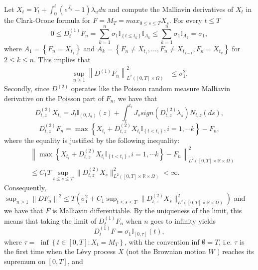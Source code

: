 \documentclass[11pt]{article}
\numberwithin{equation}{section}
\begin{document}
Let $X_t=Y_t+\int_0^t (e^{J_u}-1) \lambda_u du$ and compute the Malliavin derivatives of $X_t$ in the Clark-Ocone formula for $F= M_T= max_{0 \leq s \leq T}X_s$. For every $t\leq T$
$$
0 \leq D_{t}^{(1)} F_{n}=\sum_{k=1}^{n} \sigma_1 \mathbb{I}_{\left\{t \leq t_{k}\right\}} \mathbb{I}_{A_{k}} \leq \sum_{k=1}^{n} \sigma_1 \mathbb{I}_{A_{k}}=\sigma_1,
$$
where $A_{1}=\left\{F_{n}=X_{t_{1}}\right\}$ and $A_{k}=\left\{F_{n} \neq X_{t_{1}}, \ldots, F_{n} \neq X_{t_{k-1}}, F_{n}=X_{t_{k}}\right\}$ for $2 \leq k \leq n$. This implies that 
\begin{align*}
\sup _{n \geq 1}\left\|D^{(1)} F_{n}\right\|_{L^{2}([0, T] \times \Omega)}^{2} & \leq \sigma_1^{2}.
\end{align*} 
Secondly, since $D^{(2)}$ operates like the Poisson random measure Malliavin derivative on the Poisson part of $F_{n}$, we have that
$$D_{t, z}^{(2)} X_{t_i}=J_{t}\mathbb{I}_{(0,\lambda_t)}(z)+\int_t^{t_i} J_s sign{(D_{t,z}^{(2)}\lambda_s)}N_{t,z}(ds), $$
$$
D_{t, z}^{(2)} F_{n}=\max \left\{X_{t_{i}}+D_{t,z}^{(2)}X_{t_i} \mathbb{I}_{\left\{t<t_{i}\right\}}, i=1,\cdots k\right\}-F_{n},
$$
where the equality is justified by the following inequality:
\begin{align*}
&\left\|\max \left\{X_{t_{i}} +D_{t,z}^{(2)}X_{t_i} \mathbb{I}_{\left\{t<t_{i}\right\}}, i=1,\cdots k\right\}-F_{n}\right\|_{L^{2}([0, T] \times \mathbb{R} \times \Omega)}^{2}\\ 
&\leq C_1T \sup_{t \leq s \leq T} \| D_{t,z}^{(2)}X_{s} \|_{L^{2}([0, T] \times \mathbb{R} \times \Omega)}^{2} < \infty.
\end{align*}
Consequently, $\sup _{n \geq 1}\left\|D F_{n}\right\|^{2} \leq T\left(\sigma_1^{2}+C_1\sup_{t \leq s \leq T} \| D_{t,z}^{(2)}X_s \|_{L^{2}([0, T] \times \mathbb{R} \times \Omega)}^{2}\right)$ and we have that $F$ is Malliavin differentiable. By the uniqueness of the limit, this means that taking the limit of $D_{t}^{(1)} F_{n}$ when $n$ goes to infinity yields $$D_{t}^{(1)} F=\sigma_1 \mathbb{I}_{[0, \tau]}(t),$$
where $\tau=$ $\inf \left\{t \in[0, T]: X_{t}=M_{T}\right\}$, with the convention inf $\emptyset=T$, i.e. $\tau$ is the first time when the Lévy process $X$ (not the Brownian motion $W$ ) reaches its supremum on $[0, T]$, and
\end{document}
